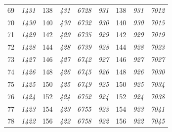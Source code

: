 \documentclass[10pt,fleqn]{article}
\begin{document}
\begin{longtable}{c|cccccccc}
69 & {\color{blue} \it 1431 \rm} & {\color{black} 138} & {\color{blue} \it 431 \rm} & {\color{blue} \it 6728 \rm} & {\color{blue} \it 931 \rm} & {\color{black} 138} & {\color{blue} \it 931 \rm} & {\color{blue} \it 7012 \rm} \\
70 & {\color{blue} \it 1430 \rm} & {\color{black} 140} & {\color{blue} \it 430 \rm} & {\color{blue} \it 6732 \rm} & {\color{blue} \it 930 \rm} & {\color{black} 140} & {\color{blue} \it 930 \rm} & {\color{blue} \it 7015 \rm} \\
71 & {\color{blue} \it 1429 \rm} & {\color{black} 142} & {\color{blue} \it 429 \rm} & {\color{blue} \it 6735 \rm} & {\color{blue} \it 929 \rm} & {\color{black} 142} & {\color{blue} \it 929 \rm} & {\color{blue} \it 7019 \rm} \\
72 & {\color{blue} \it 1428 \rm} & {\color{black} 144} & {\color{blue} \it 428 \rm} & {\color{blue} \it 6739 \rm} & {\color{blue} \it 928 \rm} & {\color{black} 144} & {\color{blue} \it 928 \rm} & {\color{blue} \it 7023 \rm} \\
73 & {\color{blue} \it 1427 \rm} & {\color{black} 146} & {\color{blue} \it 427 \rm} & {\color{blue} \it 6742 \rm} & {\color{blue} \it 927 \rm} & {\color{black} 146} & {\color{blue} \it 927 \rm} & {\color{blue} \it 7027 \rm} \\
74 & {\color{blue} \it 1426 \rm} & {\color{black} 148} & {\color{blue} \it 426 \rm} & {\color{blue} \it 6745 \rm} & {\color{blue} \it 926 \rm} & {\color{black} 148} & {\color{blue} \it 926 \rm} & {\color{blue} \it 7030 \rm} \\
75 & {\color{blue} \it 1425 \rm} & {\color{black} 150} & {\color{blue} \it 425 \rm} & {\color{blue} \it 6749 \rm} & {\color{blue} \it 925 \rm} & {\color{black} 150} & {\color{blue} \it 925 \rm} & {\color{blue} \it 7034 \rm} \\
76 & {\color{blue} \it 1424 \rm} & {\color{black} 152} & {\color{blue} \it 424 \rm} & {\color{blue} \it 6752 \rm} & {\color{blue} \it 924 \rm} & {\color{black} 152} & {\color{blue} \it 924 \rm} & {\color{blue} \it 7038 \rm} \\
77 & {\color{blue} \it 1423 \rm} & {\color{black} 154} & {\color{blue} \it 423 \rm} & {\color{blue} \it 6755 \rm} & {\color{blue} \it 923 \rm} & {\color{black} 154} & {\color{blue} \it 923 \rm} & {\color{blue} \it 7041 \rm} \\
78 & {\color{blue} \it 1422 \rm} & {\color{black} 156} & {\color{blue} \it 422 \rm} & {\color{blue} \it 6758 \rm} & {\color{blue} \it 922 \rm} & {\color{black} 156} & {\color{blue} \it 922 \rm} & {\color{blue} \it 7045 \rm} \\

\end{longtable}
\end{document}
